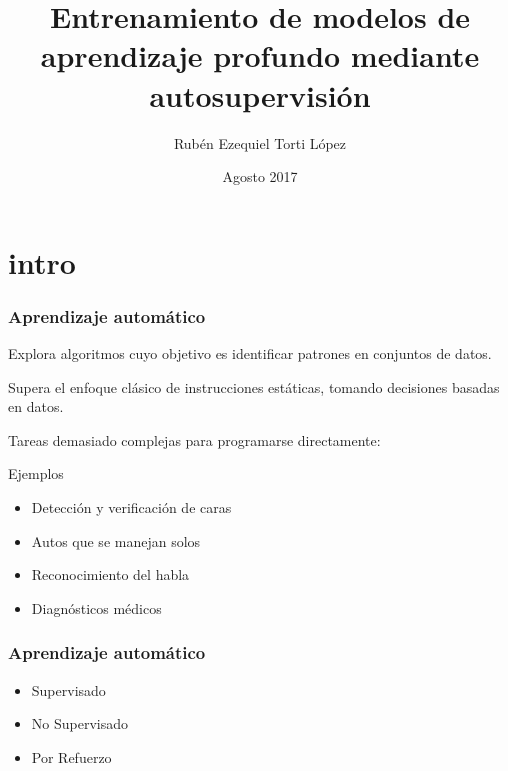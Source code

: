 \documentclass{beamer}
\title{Entrenamiento de modelos de aprendizaje profundo mediante autosupervisión}
\author
{Rubén Ezequiel Torti López}
\institute
{
  Facultad de Matemática, Astronomía, Física y Computación\\
  Universidad Nacional de Córdoba
}
\date
{Agosto 2017}
\begin{document}
\frame{\titlepage}




\section{intro}
\begin{frame}
\frametitle{Aprendizaje automático}
Explora algoritmos cuyo objetivo es identificar patrones en conjuntos de datos.\pause
\vfill

Supera el enfoque clásico de instrucciones estáticas, tomando decisiones basadas en datos.\pause
\vfill

Tareas demasiado complejas para programarse directamente:
\vfill
\begin{examples}{Ejemplos}
\begin{itemize}
    \item Detección y verificación de caras
    \item Autos que se manejan solos 
    \item Reconocimiento del habla
    \item Diagnósticos médicos 
\end{itemize}
\end{examples}
\end{frame}





\begin{frame}
\frametitle{Aprendizaje automático}
\vfill
\begin{itemize}
    \item<1-> Supervisado 
    \item<2-> No Supervisado 
    \item<3-> Por Refuerzo 
\end{itemize}
\vfill
\end{frame}

\end{document}
